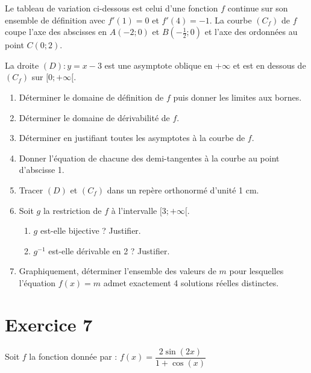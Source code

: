 \documentclass[12pt]{article}
\begin{document}
Le tableau de variation ci-dessous est celui d'une fonction $f$ continue sur son ensemble de définition avec $f'(1) = 0$ et $f'(4) = -1$. La courbe $(C_f)$ de $f$ coupe l'axe des abscisses en $A(-2;0)$ et $B\left(-\frac{1}{2};0\right)$ et l'axe des ordonnées au point $C(0;2)$.

La droite $(D) : y = x - 3$ est une asymptote oblique en $+\infty$ et est en dessous de $(C_f)$ sur $[0; +\infty[$.


\begin{enumerate}
    \item Déterminer le domaine de définition de $f$ puis donner les limites aux bornes.
    \item Déterminer le domaine de dérivabilité de $f$.
    \item Déterminer en justifiant toutes les asymptotes à la courbe de $f$.
    \item Donner l'équation de chacune des demi-tangentes à la courbe au point d'abscisse 1.
    \item Tracer $(D)$ et $(C_f)$ dans un repère orthonormé d'unité 1 cm.
    \item Soit $g$ la restriction de $f$ à l'intervalle $[3; +\infty[$.
    \begin{enumerate}
        \item $g$ est-elle bijective ? Justifier.
        \item $g^{-1}$ est-elle dérivable en 2 ? Justifier.
    \end{enumerate}
    \item Graphiquement, déterminer l'ensemble des valeurs de $m$ pour lesquelles l'équation $f(x) = m$ admet exactement 4 solutions réelles distinctes.
\end{enumerate}
\section*{Exercice 7}

Soit $f$ la fonction donnée par : $f(x) = \dfrac{2 \sin(2x)}{1 + \cos(x)}$
\end{document}
